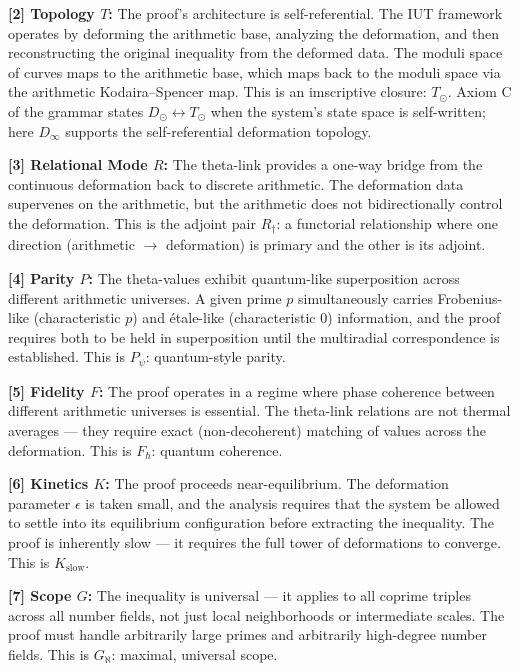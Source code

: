 \documentclass[12pt,a4paper]{article}
\begin{document}
\textbf{{[}2{]} Topology $T$:} The proof's architecture is self-referential. The IUT framework operates by deforming the arithmetic base, analyzing the deformation, and then reconstructing the original inequality from the deformed data. The moduli space of curves maps to the arithmetic base, which maps back to the moduli space via the arithmetic Kodaira--Spencer map. This is an imscriptive closure: $T_{\odot}$. Axiom C of the grammar states $D_{\odot} \leftrightarrow T_{\odot}$ when the system's state space is self-written; here $D_{\infty}$ supports the self-referential deformation topology.

\textbf{{[}3{]} Relational Mode $R$:} The theta-link provides a one-way bridge from the continuous deformation back to discrete arithmetic. The deformation data supervenes on the arithmetic, but the arithmetic does not bidirectionally control the deformation. This is the adjoint pair $R_{\dagger}$: a functorial relationship where one direction (arithmetic $\rightarrow$ deformation) is primary and the other is its adjoint.

\textbf{{[}4{]} Parity $P$:} The theta-values exhibit quantum-like superposition across different arithmetic universes. A given prime $p$ simultaneously carries Frobenius-like (characteristic $p$) and étale-like (characteristic $0$) information, and the proof requires both to be held in superposition until the multiradial correspondence is established. This is $P_{\psi}$: quantum-style parity.

\textbf{{[}5{]} Fidelity $F$:} The proof operates in a regime where phase coherence between different arithmetic universes is essential. The theta-link relations are not thermal averages --- they require exact (non-decoherent) matching of values across the deformation. This is $F_{\hbar}$: quantum coherence.

\textbf{{[}6{]} Kinetics $K$:} The proof proceeds near-equilibrium. The deformation parameter $\epsilon$ is taken small, and the analysis requires that the system be allowed to settle into its equilibrium configuration before extracting the inequality. The proof is inherently slow --- it requires the full tower of deformations to converge. This is $K_\text{slow}$.

\textbf{{[}7{]} Scope $G$:} The inequality is universal --- it applies to all coprime triples across all number fields, not just local neighborhoods or intermediate scales. The proof must handle arbitrarily large primes and arbitrarily high-degree number fields. This is $G_{\aleph}$: maximal, universal scope.
\end{document}
